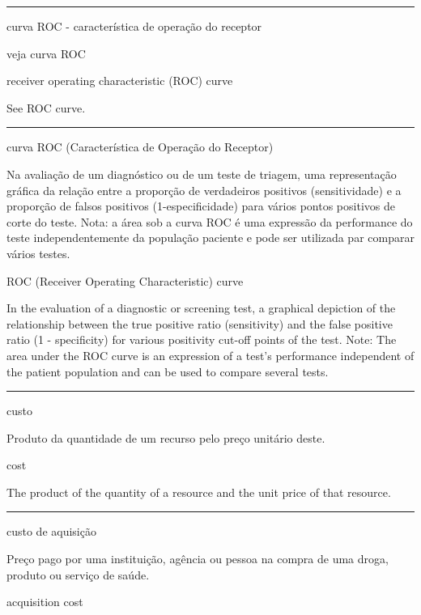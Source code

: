 \documentclass[
  openany]{book}
\begin{document}
\begin{center}\rule{0.5\linewidth}{0.5pt}\end{center}

curva ROC - característica de operação do receptor

veja curva ROC

receiver operating characteristic (ROC) curve

See ROC curve.

\begin{center}\rule{0.5\linewidth}{0.5pt}\end{center}

curva ROC (Característica de Operação do Receptor)

Na avaliação de um diagnóstico ou de um teste de triagem, uma representação gráfica da relação entre a proporção de verdadeiros positivos (sensitividade) e a proporção de falsos positivos (1-especificidade) para vários pontos positivos de corte do teste. Nota: a área sob a curva ROC é uma expressão da performance do teste independentemente da população paciente e pode ser utilizada par comparar vários testes.

ROC (Receiver Operating Characteristic) curve

In the evaluation of a diagnostic or screening test, a graphical depiction of the relationship between the true positive ratio (sensitivity) and the false positive ratio (1 - specificity) for various positivity cut-off points of the test. Note: The area under the ROC curve is an expression of a test's performance independent of the patient population and can be used to compare several tests.

\begin{center}\rule{0.5\linewidth}{0.5pt}\end{center}

custo

Produto da quantidade de um recurso pelo preço unitário deste.

cost

The product of the quantity of a resource and the unit price of that resource.

\begin{center}\rule{0.5\linewidth}{0.5pt}\end{center}

custo de aquisição

Preço pago por uma instituição, agência ou pessoa na compra de uma droga, produto ou serviço de saúde.

acquisition cost
\end{document}
